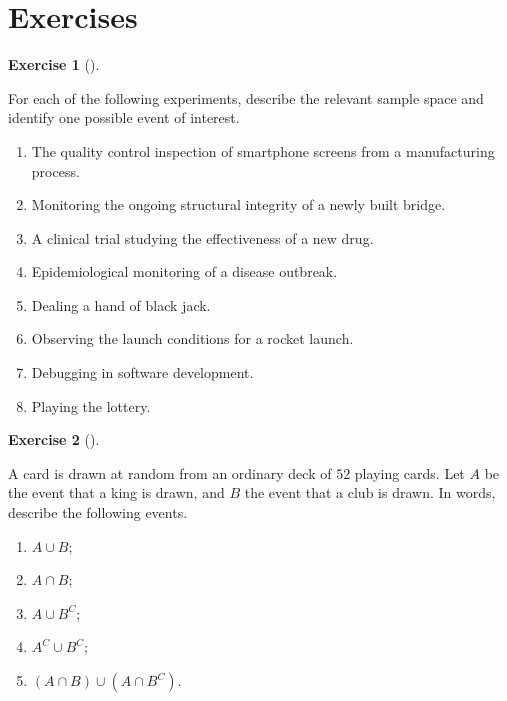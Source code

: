 \documentclass[
  letterpaper,
  DIV=11,
  numbers=noendperiod]{scrreprt}
\providecommand{\tightlist}{%
  \setlength{\itemsep}{0pt}\setlength{\parskip}{0pt}}\usepackage{longtable,booktabs,array}
\theoremstyle{definition}
\newtheorem{exercise}{Exercise}[chapter]
\theoremstyle{definition}
\theoremstyle{definition}
\theoremstyle{remark}
\begin{document}
\section*{Exercises}\label{exercises}


\begin{exercise}[]\protect\hypertarget{exr-2.1}{}\label{exr-2.1}

For each of the following experiments, describe the relevant sample
space and identify one possible event of interest.

\begin{enumerate}
\def\labelenumi{\alph{enumi}.}
\tightlist
\item
  The quality control inspection of smartphone screens from a
  manufacturing process.
\item
  Monitoring the ongoing structural integrity of a newly built bridge.
\item
  A clinical trial studying the effectiveness of a new drug.
\item
  Epidemiological monitoring of a disease outbreak.
\item
  Dealing a hand of black jack.
\item
  Observing the launch conditions for a rocket launch.
\item
  Debugging in software development.
\item
  Playing the lottery.
\end{enumerate}

\end{exercise}

\begin{exercise}[]\protect\hypertarget{exr-2.2}{}\label{exr-2.2}

A card is drawn at random from an ordinary deck of \(52\) playing cards.
Let \(A\) be the event that a king is drawn, and \(B\) the event that a
club is drawn. In words, describe the following events.

\begin{enumerate}
\def\labelenumi{\alph{enumi}.}
\tightlist
\item
  \(A\cup B\);
\item
  \(A \cap B\);
\item
  \(A\cup B^C\);
\item
  \(A^C\cup B^C\);
\item
  \((A\cap B)\cup(A\cap B^C)\).
\end{enumerate}

\end{exercise}
\end{document}
